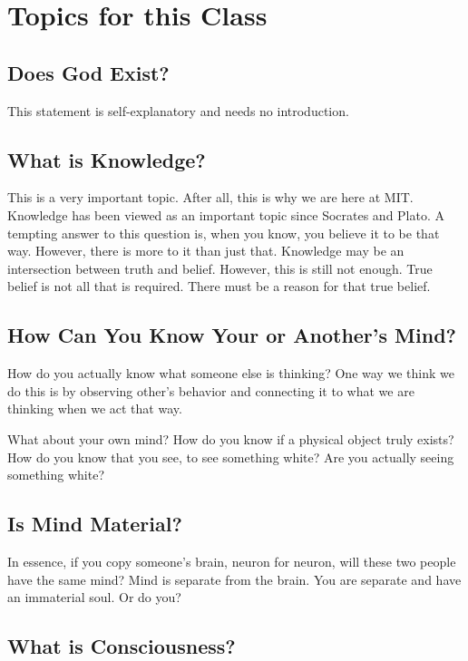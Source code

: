 \documentclass{article}
\begin{document}
\section{Topics for this Class}

\subsection{Does God Exist?}

This statement is self-explanatory and needs no introduction.

\subsection{What is Knowledge?}

This is a very important topic. After all, this is why we are here at MIT.
Knowledge has been viewed as an important topic since Socrates and Plato. A
tempting answer to this question is, when you know, you believe it to be that
way. However, there is more to it than just that. Knowledge may be an
intersection between truth and belief. However, this is still not enough. True
belief is not all that is required. There must be a reason for that true belief.

\subsection{How Can You Know Your or Another's Mind?}

How do you actually know what someone else is thinking? One way we think we do
this is by observing other's behavior and connecting it to what we are thinking
when we act that way.

What about your own mind? How do you know if a physical object truly exists? How
do you know that you see, to see something white? Are you actually seeing
something white?

\subsection{Is Mind Material?}

In essence, if you copy someone's brain, neuron for neuron, will these two
people have the same mind? Mind is separate from the brain. You are separate and
have an immaterial soul. Or do you?

\subsection{What is Consciousness?}
\end{document}

